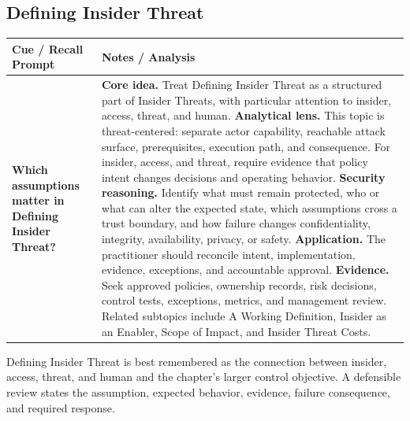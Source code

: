 \documentclass[11pt]{article}
\newcommand{\CornellHeader}{%
\rowcolor{Navy}\color{white}\bfseries Cue / Recall Prompt & \color{white}\bfseries Notes / Analysis\\\hline}
\newcommand{\CornellRow}[2]{%
\cellcolor{CueGray}\RaggedRight\textbf{#1} & \RaggedRight #2\\\hline}
\begin{document}
\subsection*{Defining Insider Threat}
\begin{longtable}{>{\RaggedRight\arraybackslash}p{}|>{\RaggedRight\arraybackslash}p{}}
\CornellHeader
\CornellRow{Which assumptions matter in Defining Insider Threat?}{\textbf{Core idea.} Treat Defining Insider Threat as a structured part of Insider Threats, with particular attention to insider, access, threat, and human. \textbf{Analytical lens.} This topic is threat-centered: separate actor capability, reachable attack surface, prerequisites, execution path, and consequence. For insider, access, and threat, require evidence that policy intent changes decisions and operating behavior. \textbf{Security reasoning.} Identify what must remain protected, who or what can alter the expected state, which assumptions cross a trust boundary, and how failure changes confidentiality, integrity, availability, privacy, or safety. \textbf{Application.} The practitioner should reconcile intent, implementation, evidence, exceptions, and accountable approval. \textbf{Evidence.} Seek approved policies, ownership records, risk decisions, control tests, exceptions, metrics, and management review. Related subtopics include A Working Definition, Insider as an Enabler, Scope of Impact, and Insider Threat Costs.}
\end{longtable}
\begin{topicsummary}
Defining Insider Threat is best remembered as the connection between insider, access, threat, and human and the chapter's larger control objective. A defensible review states the assumption, expected behavior, evidence, failure consequence, and required response.
\end{topicsummary}
\end{document}
